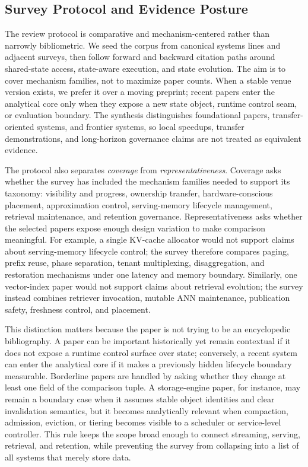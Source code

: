 ﻿\documentclass[manuscript]{acmart}
\begin{document}
\subsection{Survey Protocol and Evidence Posture}

The review protocol is comparative and mechanism-centered rather than narrowly bibliometric. We seed the corpus from canonical systems lines and adjacent surveys, then follow forward and backward citation paths around shared-state access, state-aware execution, and state evolution. The aim is to cover mechanism families, not to maximize paper counts. When a stable venue version exists, we prefer it over a moving preprint; recent papers enter the analytical core only when they expose a new state object, runtime control seam, or evaluation boundary. The synthesis distinguishes foundational papers, transfer-oriented systems, and frontier systems, so local speedups, transfer demonstrations, and long-horizon governance claims are not treated as equivalent evidence.

The protocol also separates \emph{coverage} from \emph{representativeness}. Coverage asks whether the survey has included the mechanism families needed to support its taxonomy: visibility and progress, ownership transfer, hardware-conscious placement, approximation control, serving-memory lifecycle management, retrieval maintenance, and retention governance. Representativeness asks whether the selected papers expose enough design variation to make comparison meaningful. For example, a single KV-cache allocator would not support claims about serving-memory lifecycle control; the survey therefore compares paging, prefix reuse, phase separation, tenant multiplexing, disaggregation, and restoration mechanisms under one latency and memory boundary. Similarly, one vector-index paper would not support claims about retrieval evolution; the survey instead combines retriever invocation, mutable ANN maintenance, publication safety, freshness control, and placement.

This distinction matters because the paper is not trying to be an encyclopedic bibliography. A paper can be important historically yet remain contextual if it does not expose a runtime control surface over state; conversely, a recent system can enter the analytical core if it makes a previously hidden lifecycle boundary measurable. Borderline papers are handled by asking whether they change at least one field of the comparison tuple. A storage-engine paper, for instance, may remain a boundary case when it assumes stable object identities and clear invalidation semantics, but it becomes analytically relevant when compaction, admission, eviction, or tiering becomes visible to a scheduler or service-level controller. This rule keeps the scope broad enough to connect streaming, serving, retrieval, and retention, while preventing the survey from collapsing into a list of all systems that merely store data.
\end{document}
